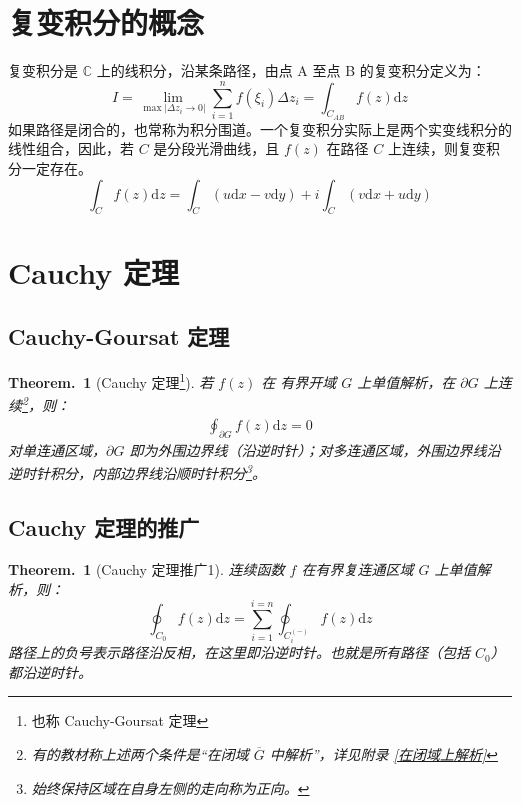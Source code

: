 \documentclass[UTF8]{report}
\def\C{\mathbb{C}}
\theoremstyle{MyLineTheoremStyle} %
\theoremstyle{MyBlockTheoremStyle} %
\newtheorem{BlockTheorem}[LineTheorem]{Theorem.\,} %
\theoremstyle{MySubsubsectionStyle} %
\begin{document}
\section{复变积分的概念}
复变积分是 $\C$ 上的线积分，沿某条路径，由点 A 至点 B 的复变积分定义为：
\begin{equation}
I = \lim_{\max | \Delta z_i \to 0|}\sum_{i=1}^{n} f(\xi_i)\Delta z_i = \int_{C_{AB}} f(z) \mathrm{d}z
\end{equation}
如果路径是闭合的，也常称为积分围道。一个复变积分实际上是两个实变线积分的线性组合，因此，若 $C$ 是分段光滑曲线，且 $f(z)$ 在路径 $C$ 上连续，则复变积分一定存在。
\begin{equation}
\int_{C}f(z) \mathrm{d}z = \int_{C}(u \mathrm{d}x - v \mathrm{d}y) + i \int_{C}( v \mathrm{d}x + u \mathrm{d}y)
\end{equation}

\section{Cauchy 定理}

\subsection{Cauchy-Goursat 定理}

\begin{BlockTheorem}[Cauchy 定理\footnote{也称 Cauchy-Goursat 定理}]\label{Cauchy 定理}
若 $f(z)$ 在{\color{red} 有界}开域 $G$ 上单值解析，在 $\partial G$ 上连续\footnote{有的教材称上述两个条件是“在闭域 $\overline{G}$ 中解析”，详见附录 \ref{在闭域上解析}}，则：
\begin{gather}
\oint_{\partial G} f(z) \mathrm{d}z = 0
\end{gather}
对单连通区域，$\partial G$ 即为外围边界线（沿逆时针）；对多连通区域，外围边界线沿逆时针积分，内部边界线沿顺时针积分\footnote{始终保持区域在自身左侧的走向称为正向。}。
\end{BlockTheorem}

\subsection{Cauchy 定理的推广}

\begin{BlockTheorem}[Cauchy 定理推广1]\label{Cauchy 定理推广1}
连续函数 $f$ 在有界复连通区域 $G$ 上单值解析，则：
\begin{equation}
\oint_{C_0} f(z) \mathrm{d}z = \sum_{i=1}^{i=n} \oint_{C_i^{(-)}} f(z) \mathrm{d}z
\end{equation}
路径上的负号表示路径沿反相，在这里即沿逆时针。也就是所有路径（包括 $C_0$）都沿逆时针。
\end{BlockTheorem}
\end{document}
